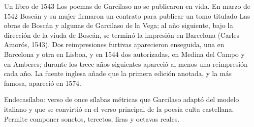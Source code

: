 \documentclass{book}
\begin{document}
\begin{tcolorbox}[title={Definición}, studiumdef, breakable]

Un libro de 1543
Los poemas de Garcilaso no se publicaron en vida. En marzo de 1542 Boscán y su mujer firmaron un contrato para publicar un tomo titulado Las obras de Boscán y algunas de Garcilaso de la Vega; al año siguiente, bajo la dirección de la viuda de Boscán, se terminó la impresión en Barcelona (Carles Amorós, 1543). Dos reimpresiones furtivas aparecieron enseguida, una en Barcelona y otra en Lisboa, y en 1544 dos autorizadas, en Medina del Campo y en Amberes; durante los trece años siguientes apareció al menos una reimpresión cada año. La fuente inglesa añade que la primera edición anotada, y la más famosa, apareció en 1574.

\end{tcolorbox}

\begin{tcolorbox}[title={Definición}, studiumdef, breakable]

Endecasílabo: verso de once sílabas métricas que Garcilaso adaptó del modelo italiano y que se convirtió en el verso principal de la poesía culta castellana. Permite componer sonetos, tercetos, liras y octavas reales.

\end{tcolorbox}
\end{document}
